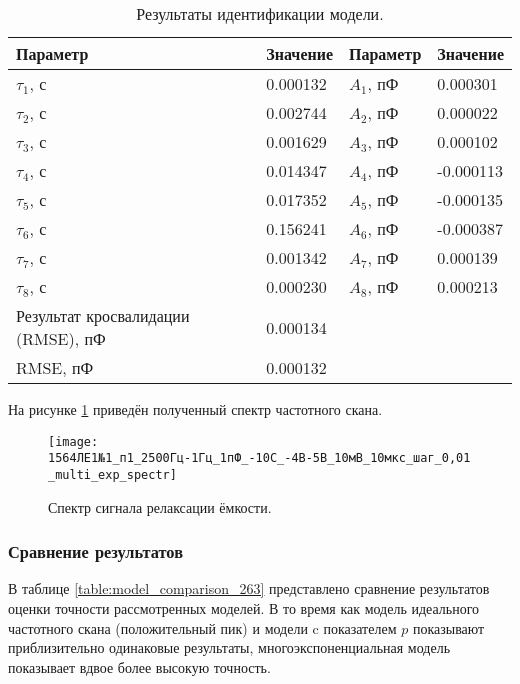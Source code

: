 	\begin{table}[!htp]
    	\centering
    	\caption{Результаты идентификации модели.}
		\begin{tabular}{|l|l|l|l|}
			\hline
			Параметр                           & Значение & Параметр  & Значение  \\ \hline
			$\tau_1$, с                        & 0.000132 & $A_1$, пФ &  0.000301 \\ \hline
			$\tau_2$, с                        & 0.002744 & $A_2$, пФ &  0.000022 \\ \hline
			$\tau_3$, с                        & 0.001629 & $A_3$, пФ &  0.000102 \\ \hline
			$\tau_4$, с                        & 0.014347 & $A_4$, пФ & -0.000113 \\ \hline
			$\tau_5$, с                        & 0.017352 & $A_5$, пФ & -0.000135 \\ \hline
			$\tau_6$, с                        & 0.156241 & $A_6$, пФ & -0.000387 \\ \hline
			$\tau_7$, с                        & 0.001342 & $A_7$, пФ &  0.000139 \\ \hline
			$\tau_8$, с                        & 0.000230 & $A_8$, пФ &  0.000213 \\ \hline
			Результат кросвалидации (RMSE), пФ & 0.000134 &           &           \\ \hline
			RMSE, пФ                           & 0.000132 &           &           \\ \hline
		\end{tabular}
		\label{table:multi_exp_results_263}
	\end{table}

	На рисунке \ref{pic:multi_exp_spectr_263} приведён полученный спектр 
	частотного скана.

	\begin{figure}[!htp]
		\centering
		\texttt{[image: 1564ЛЕ1№1\_п1\_2500Гц-1Гц\_1пФ\_-10С\_-4В-5В\_10мВ\_10мкс\_шаг\_0,01\_multi\_exp\_spectr]}
		\caption{Спектр сигнала релаксации ёмкости.}
		\label{pic:multi_exp_spectr_263}
	\end{figure}


	\newpage
	\subsubsection{Сравнение результатов}
	В таблице \ref{table:model_comparison_263} представлено сравнение результатов
	оценки точности рассмотренных моделей. В то время как модель идеального
	частотного скана (положительный пик) и модели c показателем $p$ показывают 
	приблизительно одинаковые результаты, многоэкспоненциальная модель показывает
	вдвое более высокую точность.
	
